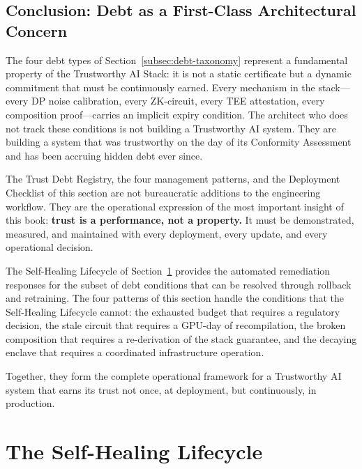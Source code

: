\subsection{Conclusion: Debt as a First-Class Architectural
            Concern}
\label{subsec:debt-conclusion}

The four debt types of Section~\ref{subsec:debt-taxonomy}
represent a fundamental property of the Trustworthy AI Stack:
it is not a static certificate but a dynamic commitment that
must be continuously earned.
Every mechanism in the stack---every DP noise calibration,
every ZK-circuit, every TEE attestation, every composition
proof---carries an implicit expiry condition.
The architect who does not track these conditions is not
building a Trustworthy AI system.
They are building a system that was trustworthy on the day
of its Conformity Assessment and has been accruing hidden
debt ever since.

The Trust Debt Registry, the four management patterns, and
the Deployment Checklist of this section are not
bureaucratic additions to the engineering workflow.
They are the operational expression of the most important
insight of this book: \textbf{trust is a performance, not a
property.}
It must be demonstrated, measured, and maintained with every
deployment, every update, and every operational decision.

The Self-Healing Lifecycle of Section~\ref{sec:self_healing}
provides the automated remediation responses for the subset
of debt conditions that can be resolved through rollback
and retraining.
The four patterns of this section handle the conditions that
the Self-Healing Lifecycle cannot: the exhausted budget that
requires a regulatory decision, the stale circuit that
requires a GPU-day of recompilation, the broken composition
that requires a re-derivation of the stack guarantee, and
the decaying enclave that requires a coordinated
infrastructure operation.

Together, they form the complete operational framework for
a Trustworthy AI system that earns its trust not once,
at deployment, but continuously, in production.

\section{The Self-Healing Lifecycle}
\label{sec:self_healing}

